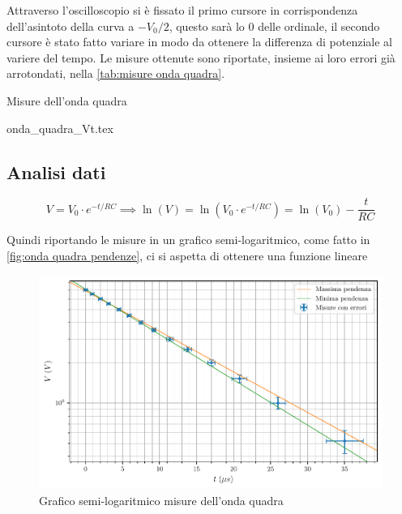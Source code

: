\documentclass[11pt, a4paper]{article}
\numberwithin{equation}{section} %
\begin{document}
Attraverso l'oscilloscopio si è fissato il primo cursore in corrispondenza dell'asintoto della curva a \(- V_{0}/2\), questo sarà lo \(0\) delle ordinale, il secondo cursore è stato fatto variare in modo da ottenere la differenza di potenziale al variere del tempo. Le misure ottenute sono riportate, insieme ai loro errori già arrotondati, nella \autoref{tab:misure onda quadra}.


\begin{table}[ht!]
    \centering
    \caption{Misure dell'onda quadra}
    {onda_quadra_Vt.tex}
    \label{tab:misure onda quadra}
\end{table}

\newpage

\subsection{Analisi dati}

\begin{equation*}
    V = V_{0} \cdot e^{-t/RC} \implies \ln(V) = \ln(V_{0} \cdot e^{-t/RC}) = \ln(V_{0}) - \frac{t}{RC}
\end{equation*}

Quindi riportando le misure in un grafico semi-logaritmico, come fatto in \autoref{fig:onda quadra pendenze}, ci si aspetta di ottenere una funzione lineare

\begin{figure}[ht!]
    \includegraphics{onda_quadra_V(t)_pendenze.pdf}
    \caption{Grafico semi-logaritmico misure dell'onda quadra}
    \label{fig:onda quadra pendenze}
\end{figure}
\end{document}
